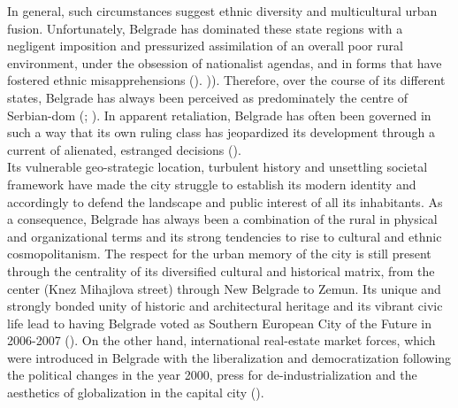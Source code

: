 \documentclass[11pt]{report}
\begin{document}
In general, such circumstances suggest ethnic diversity and multicultural urban fusion. Unfortunately, Belgrade  has dominated these state  regions with a negligent imposition and pressurized assimilation of an overall poor rural environment, under the obsession of nationalist agendas, and in forms that have fostered ethnic misapprehensions (\href{Samardzic}{\citealt{doytchinov_belgrade_2015}}).
)). Therefore, over the course of its different states, Belgrade has always been perceived as predominately the centre of Serbian-dom (\href{Savic}{\citealt{savic_where_2014}}; \href{Heppner}{\citealt{doytchinov_capital_2015}}).
In apparent retaliation, Belgrade has often been  governed in such a way that its own ruling class has jeopardized its development through a current of alienated, estranged decisions (\href{Doytchinov}{\citealt{doytchinov_belgrade_2015}}).
\\

Its vulnerable geo-strategic location, turbulent history and unsettling societal framework have made the city struggle to establish its modern identity and accordingly to defend the landscape and public interest of all its inhabitants. As a consequence, Belgrade has always been a combination of the rural in physical and organizational terms and its strong tendencies to rise to cultural and ethnic cosmopolitanism. The respect for the urban memory of the city is still present through the centrality of its diversified cultural and historical matrix, from the center (Knez Mihajlova street) through New Belgrade to Zemun. Its unique and strongly bonded unity of historic and architectural heritage and its vibrant civic life lead to having Belgrade voted as Southern European City of the Future in 2006-2007  (\href{Hirt}{\citealt{hirt_belgrade_2009}}).
On the other hand, international real-estate market forces, which were introduced in Belgrade with the liberalization and democratization following the political changes in the year 2000, press for de-industrialization and the aesthetics of globalization in the capital city  (\href{Grozdanic}{\citealt{grozdanic_belgrade_2008}}).
\\
\end{document}
